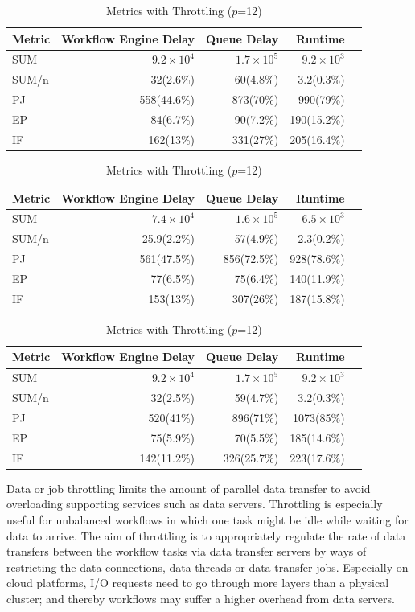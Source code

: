\begin{table}[htb]
	\footnotesize
	\centering
	\begin{tabular}{l|rrrr}
Metric & Workflow Engine Delay  &Queue Delay& Runtime\\
		\hline
		SUM & $9.2\times 10^4$ & $1.7\times 10^5$ &  $9.2\times 10^3$ \\
		SUM/n & 32(2.6\%) & 60(4.8\%)& 3.2(0.3\%) \\
		PJ & 558(44.6\%) & 873(70\%) & 990(79\%) \\
		EP & 84(6.7\%) & 90(7.2\%) & 190(15.2\%) \\
		IF & 162(13\%)& 331(27\%) & 205(16.4\%)\\
	\end{tabular}
		\caption{Metrics with Throttling ($p$=24)}
		\label{tab:profiling_throttling_24}
	\quad
	\begin{tabular}{l|rrrr}
Metric & Workflow Engine Delay  &Queue Delay& Runtime\\
		\hline
		SUM & $7.4\times 10^4$ & $1.6\times 10^5$ &  $6.5\times 10^3$ \\
		SUM/n & 25.9(2.2\%) & 57(4.9\%)& 2.3(0.2\%) \\
		PJ & 561(47.5\%) & 856(72.5\%) & 928(78.6\%) \\
		EP & 77(6.5\%) & 75(6.4\%) & 140(11.9\%) \\
		IF & 153(13\%)& 307(26\%) & 187(15.8\%)\\
	\end{tabular}
		\caption{Metrics with Throttling ($p$=16)}
		\label{tab:profiling_throttling_16}
	\quad
	\begin{tabular}{l|rrrr}
Metric & Workflow Engine Delay  &Queue Delay& Runtime\\
		\hline
		SUM & $9.2\times 10^4$ & $1.7\times 10^5$ &  $9.2\times 10^3$ \\
		SUM/n & 32(2.5\%) & 59(4.7\%)& 3.2(0.3\%) \\
		PJ & 520(41\%) & 896(71\%) & 1073(85\%) \\
		EP & 75(5.9\%) & 70(5.5\%) & 185(14.6\%) \\
		IF & 142(11.2\%)& 326(25.7\%) & 223(17.6\%)\\
	\end{tabular}
		\caption{Metrics with Throttling ($p$=12)}
	\label{tab:profiling_throttling_12}
\end{table}


Data or job throttling limits the amount of parallel data transfer to avoid overloading supporting services such as data servers. Throttling is especially useful for unbalanced workflows in which one task might be idle while waiting for data to arrive. The aim of throttling is to appropriately regulate the rate of data transfers between the workflow tasks via data transfer servers by ways of restricting the data connections, data threads or data transfer jobs. Especially on cloud platforms, I/O requests need to go through more layers than a physical cluster; and thereby workflows may suffer a higher overhead from data servers.

